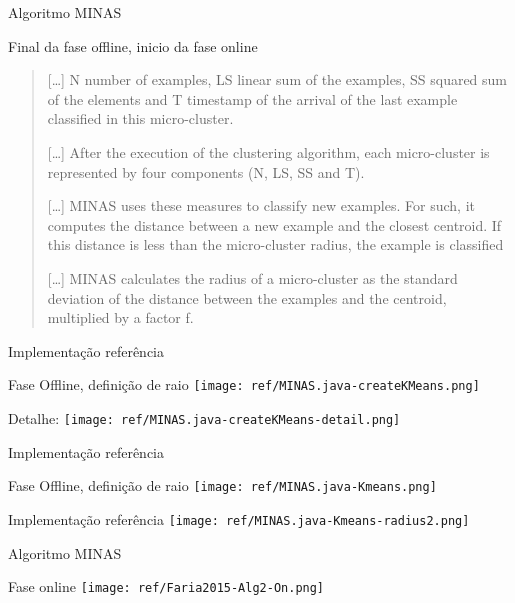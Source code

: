 \documentclass[aspectratio=43,10pt]{beamer}
\begin{document}
\begin{frame}[fragile]{Algoritmo MINAS}
  \begin{alertblock}{Final da fase offline, inicio da fase online}
    \begin{quotation}
    
      [\dots] N number of examples, LS linear sum of the examples, SS squared sum of the
      elements and T timestamp of the arrival of the last example classified in
      this micro-cluster.

      [\dots]
      After the execution of the clustering algorithm, each micro-cluster is
      represented by \alert{four components (N, LS, SS and T)}.
      
      [\dots]
      MINAS uses these measures to classify new examples. For such, it computes
      the distance between a new example and the closest centroid. If this
      distance is less than the micro-cluster radius, the example is classified
      
      [\dots]
      MINAS calculates the \alert{radius of a micro-cluster as the standard
      deviation} of the distance between the examples and the centroid, multiplied
      by a \alert{factor f}.
    
    \end{quotation}
  \end{alertblock}
\end{frame}

\begin{frame}[fragile]{Implementação referência}
  \begin{alertblock}{Fase Offline, definição de raio}
    \texttt{[image: ref/MINAS.java-createKMeans.png]}
    
    Detalhe:
    \texttt{[image: ref/MINAS.java-createKMeans-detail.png]}
  \end{alertblock}
\end{frame}
\begin{frame}[fragile]{Implementação referência}
  \begin{alertblock}{Fase Offline, definição de raio}
    \texttt{[image: ref/MINAS.java-Kmeans.png]}
  \end{alertblock}
\end{frame}
\begin{frame}[fragile]{Implementação referência}
  \texttt{[image: ref/MINAS.java-Kmeans-radius2.png]}
\end{frame}


\begin{frame}[fragile]{Algoritmo MINAS}
  \begin{alertblock}{Fase online}
    \texttt{[image: ref/Faria2015-Alg2-On.png]}
  \end{alertblock}
\end{frame}
\end{document}
